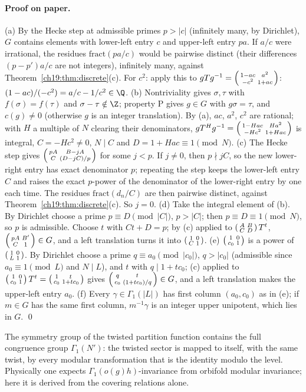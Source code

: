 \paragraph{Proof on paper.}  (a) By the Hecke step at admissible primes $p>|c|$ (infinitely many, by Dirichlet), $G$ contains elements with
lower-left entry $c$ and upper-left entry $pa$.  If $a/c$ were irrational, the residues $\mathrm{fract}(pa/c)$ would be pairwise distinct (their
differences $(p-p')a/c$ are not integers), infinitely many, against Theorem~\ref{ch19:thm:discrete}(c).  For $c^2$: apply this to
$gTg^{-1}=\left(\begin{smallmatrix}1-ac&a^2\\-c^2&1+ac\end{smallmatrix}\right)$: $(1-ac)/(-c^2)=a/c-1/c^2\in\Q$.  (b) Nontriviality gives $\sigma,\tau$ with $f(\sigma)=f(\tau)$ and
$\sigma-\tau\notin\Z$; property P gives $g\in G$ with $g\sigma=\tau$, and $c(g)\ne0$ (otherwise $g$ is an integer translation).  By (a), $ac$, $a^2$, $c^2$
are rational; with $H$ a multiple of $N$ clearing their denominators, $gT^Hg^{-1}=\left(\begin{smallmatrix}1-Hac&Ha^2\\-Hc^2&1+Hac\end{smallmatrix}\right)$ is integral,
$C=-Hc^2\ne0$, $N\mid C$ and $D=1+Hac\equiv1\pmod N$.  (c) The Hecke step gives $\left(\begin{smallmatrix}pA&B-jA\\C&(D-jC)/p\end{smallmatrix}\right)$ for some $j<p$.  If
$j\ne0$, then $p\nmid jC$, so the new lower-right entry has exact denominator $p$; repeating the step keeps the lower-left entry $C$ and
raises the exact $p$-power of the denominator of the lower-right entry by one each time.  The residues $\mathrm{fract}(d_n/C)$ are then pairwise
distinct, against Theorem~\ref{ch19:thm:discrete}(c).  So $j=0$.  (d) Take the integral element of (b).  By Dirichlet choose a prime $p\equiv
D\pmod{|C|}$, $p>|C|$; then $p\equiv D\equiv1\pmod N$, so $p$ is admissible.  Choose $t$ with $Ct+D=p$; by (c) applied to $\left(\begin{smallmatrix}A&B\\C&D\end{smallmatrix}\right) T^t$,
$\left(\begin{smallmatrix}pA&B'\\C&1\end{smallmatrix}\right)\in G$, and a left translation turns it into $\left(\begin{smallmatrix}1&0\\C&1\end{smallmatrix}\right)$.  (e) $\left(\begin{smallmatrix}1&0\\c_0&1\end{smallmatrix}\right)$ is a power of
$\left(\begin{smallmatrix}1&0\\L&1\end{smallmatrix}\right)$.  By Dirichlet choose a prime $q\equiv a_0\pmod{|c_0|}$, $q>|c_0|$ (admissible since $a_0\equiv1\pmod L$ and $N\mid L$), and $t$
with $q\mid1+tc_0$; (c) applied to $\left(\begin{smallmatrix}1&0\\c_0&1\end{smallmatrix}\right)T^t=\left(\begin{smallmatrix}1&t\\c_0&1+tc_0\end{smallmatrix}\right)$ gives $\left(\begin{smallmatrix}q&t\\c_0&(1+tc_0)/q\end{smallmatrix}\right)\in G$, and a left
translation makes the upper-left entry $a_0$.  (f) Every $\gamma\in\Gamma_1(|L|)$ has first column $(a_0,c_0)$ as in (e); if $m\in G$ has the same
first column, $m^{-1}\gamma$ is an integer upper unipotent, which lies in $G$. \qed
\begin{physics}The symmetry group of the twisted partition function contains the full congruence group $\Gamma_1(N')$: the twisted
sector is mapped to itself, with the same twist, by every modular transformation that is the identity modulo the level.  Physically
one expects $\Gamma_1(o(g)h)$-invariance from orbifold modular invariance; here it is derived from the covering relations alone.\end{physics}
